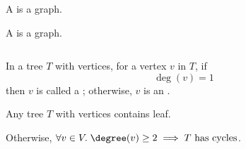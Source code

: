 
\begin{frame}{}
  \begin{definition}[Tree (树)]
    A  is a    graph.
  \end{definition}

  \pause
  \vspace{0.60cm}
  \begin{definition}[Forest (森林)]
    A  is a   graph.
  \end{definition}
\end{frame}

\begin{frame}{}
  \begin{columns}
  \end{columns}

  \pause

  \pause
  \vspace{0.30cm}
\end{frame}

\begin{frame}{}
  \begin{definition}
    In a tree $T$ with  vertices, for a vertex $v$ in $T$, if
    \[
      \deg(v) = 1
    \]
    then $v$ is called a ;
    otherwise, $v$ is an .
  \end{definition}

  \pause
  \vspace{0.30cm}

  \pause
  \begin{lemma}
    Any tree $T$ with  vertices contains  leaf.
  \end{lemma}

  \pause
  \begin{center}
    Otherwise, $\forall v \in V.\; \degree(v) \ge 2 \implies T \text{ has cycles}$.
  \end{center}
\end{frame}

